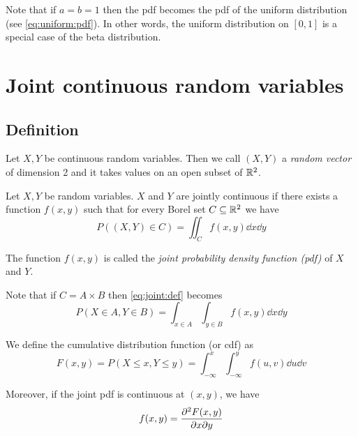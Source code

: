 \documentclass[12pt]{extarticle}
\begin{document}
Note that if $a = b = 1$ then the pdf becomes the pdf of the uniform distribution (see \autoref{eq:uniform:pdf}).
In other words, the uniform distribution on $[0, 1]$ is a special case of the beta distribution.

\section{Joint continuous random variables}

\subsection{Definition}

Let $X, Y$ be continuous random variables.
Then we call $(X, Y)$ a \emph{random vector} of dimension 2 and it takes values on an open subset of $\mathbb{R}^2$.

\begin{definition}
    Let $X, Y$ be random variables. $X$ and $Y$ are jointly continuous if there exists a function $f(x, y)$ such that for every Borel set $C \subseteq \mathbb{R}^2$ we have
    \begin{equation}
        P\left((X,Y) \in C\right) = \iint_C f(x, y) \dd{x} \dd{y} \label{eq:joint:def}
    \end{equation}

    The function $f(x,y)$ is called the \emph{joint probability density function (pdf)} of $X$ and $Y$.
\end{definition}

Note that if $C = A \times B$ then \autoref{eq:joint:def} becomes
\begin{equation}
    P(X \in A, Y \in B) = \int_{x \in A} \int_{y \in B} f(x, y) \dd{x} \dd{y}
\end{equation}

\begin{definition}
    We define the cumulative distribution function (or cdf) as
    \begin{equation}
        F(x, y) = P(X \leq x, Y \leq y) = \int_{-\infty}^x \int_{-\infty}^y f(u, v) \dd{u} \dd{v}
    \end{equation}
\end{definition}

Moreover, if the joint pdf is continuous at $(x, y)$, we have
\begin{equation}
    f(x, y) = \pdv[2]{F(x,y)}{x}{y}
\end{equation}
\end{document}
